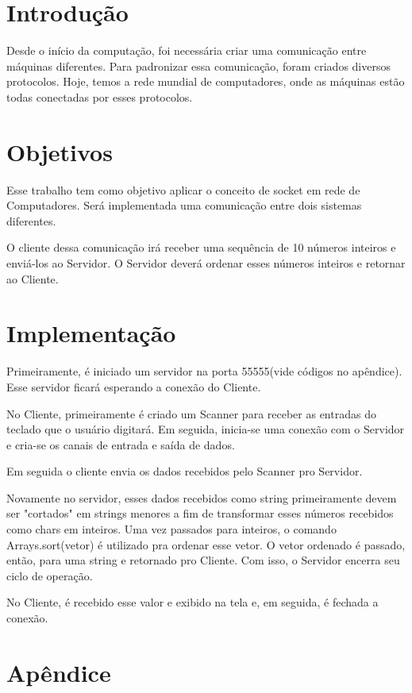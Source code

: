\documentclass[brazil, a4paper,12pt]{article}
\begin{document}

\tableofcontents 
\newpage
\section{Introdução}
Desde o início da computação, foi necessária criar uma comunicação entre máquinas diferentes. Para padronizar essa comunicação, foram criados diversos protocolos. Hoje, temos a rede mundial de computadores, onde as máquinas estão todas conectadas por esses protocolos.
\newpage
\section{Objetivos}
Esse trabalho tem como objetivo aplicar o conceito de socket em rede de Computadores. Será implementada uma comunicação entre dois sistemas diferentes.

O cliente dessa comunicação irá receber uma sequência de 10 números inteiros e enviá-los ao Servidor. O Servidor deverá ordenar esses números inteiros e retornar ao Cliente.
\newpage
\section{Implementação}
Primeiramente, é iniciado um servidor na porta 55555(vide códigos no apêndice). Esse servidor ficará esperando a conexão do Cliente.

No Cliente, primeiramente é criado um Scanner para receber as entradas do teclado que o usuário digitará. Em seguida, inicia-se uma conexão com o Servidor e cria-se os canais de entrada e saída de dados.

Em seguida o cliente envia os dados recebidos pelo Scanner pro Servidor.

Novamente no servidor, esses dados recebidos como string primeiramente devem ser "cortados" em strings menores a fim de transformar esses números recebidos como chars em inteiros. Uma vez passados para inteiros, o comando Arrays.sort(vetor) é utilizado pra ordenar esse vetor. O vetor ordenado é passado, então, para uma string e retornado pro Cliente. Com isso, o Servidor encerra seu ciclo de operação.

No Cliente, é recebido esse valor e exibido na tela e, em seguida, é fechada a conexão.
\newpage
\section{Apêndice}


\end{document}
